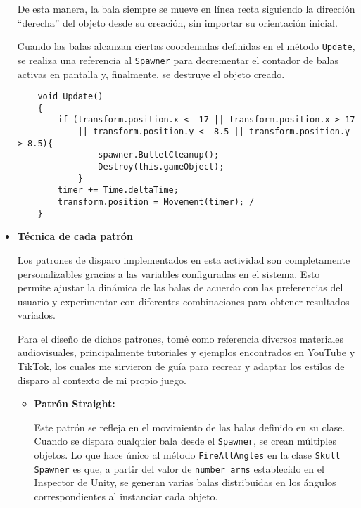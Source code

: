 \documentclass[11pt]{article}
\begin{document}
\begin{itemize}
    De esta manera, la bala siempre se mueve en línea recta siguiendo la dirección “derecha” del objeto desde su creación, sin importar su orientación inicial.

    \vspace{0.5cm}

    Cuando las balas alcanzan ciertas coordenadas definidas en el método \texttt{Update}, se realiza una referencia al \texttt{Spawner} para decrementar el contador de balas activas en pantalla y, finalmente, se destruye el objeto creado.

    \begin{verbatim}
    void Update()
    {
        if (transform.position.x < -17 || transform.position.x > 17
            || transform.position.y < -8.5 || transform.position.y > 8.5){
                spawner.BulletCleanup(); 
                Destroy(this.gameObject);  
            } 
        timer += Time.deltaTime; 
        transform.position = Movement(timer); /
    }
    \end{verbatim}

    \item \textbf{Técnica de cada patrón}
    \vspace{0.5cm}
    
    Los patrones de disparo implementados en esta actividad son completamente personalizables gracias a las variables configuradas en el sistema. Esto permite ajustar la dinámica de las balas de acuerdo con las preferencias del usuario y experimentar con diferentes combinaciones para obtener resultados variados.
    
    \vspace{0.5cm} 
    
    Para el diseño de dichos patrones, tomé como referencia diversos materiales audiovisuales, principalmente tutoriales y ejemplos encontrados en YouTube y TikTok, los cuales me sirvieron de guía para recrear y adaptar los estilos de disparo al contexto de mi propio juego.

    \vspace{0.5cm}
    \begin{itemize}
      \item \textbf{Patrón Straight:}
      
      \vspace{0.5cm}
      
      Este patrón se refleja en el movimiento de las balas definido en su clase. Cuando se dispara cualquier bala desde el \texttt{Spawner}, se crean múltiples objetos. Lo que hace único al método \texttt{FireAllAngles} en la clase \texttt{Skull Spawner} es que, a partir del valor de \texttt{number arms} establecido en el Inspector de Unity, se generan varias balas distribuidas en los ángulos correspondientes al instanciar cada objeto.


\end{itemize}
\end{itemize}
\end{document}
